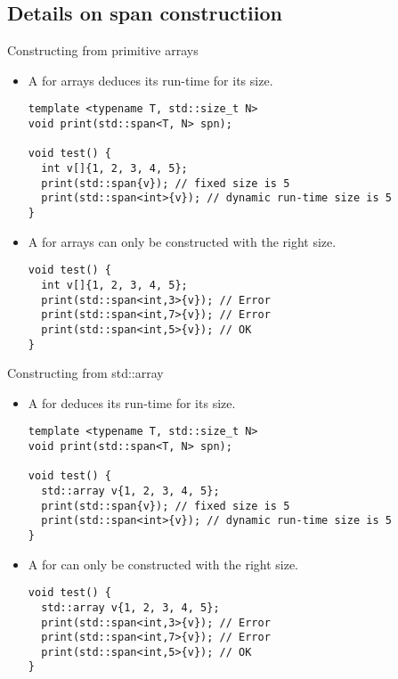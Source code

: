 \subsection{Details on span constructiion}

\begin{frame}[t,fragile]{Constructing from primitive arrays}
\begin{itemize}
  \item A   for arrays
        deduces its run-time  for its size.
\begin{lstlisting}
template <typename T, std::size_t N>
void print(std::span<T, N> spn);

void test() {
  int v[]{1, 2, 3, 4, 5};
  print(std::span{v}); // fixed size is 5
  print(std::span<int>{v}); // dynamic run-time size is 5
}
\end{lstlisting}

  \item A   for arrays
        can only be constructed with the right size.
\begin{lstlisting}
void test() {
  int v[]{1, 2, 3, 4, 5};
  print(std::span<int,3>{v}); // Error
  print(std::span<int,7>{v}); // Error
  print(std::span<int,5>{v}); // OK
}
\end{lstlisting}
\end{itemize}
\end{frame}

\begin{frame}[t,fragile]{Constructing from std::array}
\begin{itemize}
  \item A   for 
        deduces its run-time  for its size.
\begin{lstlisting}
template <typename T, std::size_t N>
void print(std::span<T, N> spn);

void test() {
  std::array v{1, 2, 3, 4, 5};
  print(std::span{v}); // fixed size is 5
  print(std::span<int>{v}); // dynamic run-time size is 5
}
\end{lstlisting}

  \item A   for 
        can only be constructed with the right size.
\begin{lstlisting}
void test() {
  std::array v{1, 2, 3, 4, 5};
  print(std::span<int,3>{v}); // Error
  print(std::span<int,7>{v}); // Error
  print(std::span<int,5>{v}); // OK
}
\end{lstlisting}
\end{itemize}
\end{frame}

